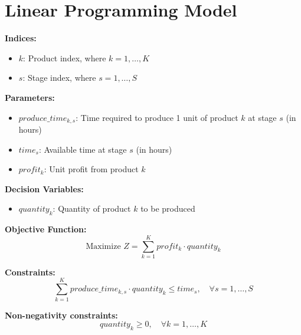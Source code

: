 \documentclass{article}
\begin{document}
\section*{Linear Programming Model}

\textbf{Indices:}
\begin{itemize}
    \item $k$: Product index, where $k = 1, \ldots, K$
    \item $s$: Stage index, where $s = 1, \ldots, S$
\end{itemize}

\textbf{Parameters:}
\begin{itemize}
    \item $produce\_time_{k, s}$: Time required to produce 1 unit of product $k$ at stage $s$ (in hours)
    \item $time_{s}$: Available time at stage $s$ (in hours)
    \item $profit_{k}$: Unit profit from product $k$
\end{itemize}

\textbf{Decision Variables:}
\begin{itemize}
    \item $quantity_{k}$: Quantity of product $k$ to be produced
\end{itemize}

\textbf{Objective Function:}
\begin{equation}
\text{Maximize } Z = \sum_{k=1}^{K} profit_{k} \cdot quantity_{k}
\end{equation}

\textbf{Constraints:}
\begin{equation}
\sum_{k=1}^{K} produce\_time_{k, s} \cdot quantity_{k} \leq time_{s}, \quad \forall s = 1, \ldots, S
\end{equation}

\textbf{Non-negativity constraints:}
\begin{equation}
quantity_{k} \geq 0, \quad \forall k = 1, \ldots, K
\end{equation}
\end{document}
